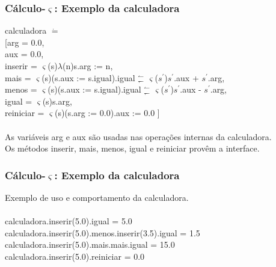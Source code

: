 \documentclass[10pt, compress]{beamer}
\begin{document}
\begin{frame}[fragile]
  \frametitle{Cálculo-$\varsigma$: Exemplo da calculadora}
  calculadora $\dot{=}$
  \\
  \hspace{0.5cm}[\hspace{0.5cm}arg = 0.0,
  \\
  \hspace{1cm} aux = 0.0,
  \\
  \hspace{1cm} inserir = $\varsigma$(s)$\lambda$(n)s.arg := n,
  \\
  \hspace{1cm} mais = $\varsigma$(s)(s.aux := s.igual).igual $^{\leftharpoonup}_{\leftharpoondown}$ $\varsigma$($s^{'}$)$s^{'}$.aux + $s^{'}$.arg,
  \\
  \hspace{1cm} menos = $\varsigma$(s)(s.aux := s.igual).igual $^{\leftharpoonup}_{\leftharpoondown}$ $\varsigma$($s^{'}$)$s^{'}$.aux - $s^{'}$.arg,
  \\
  \hspace{1cm} igual = $\varsigma$(s)s.arg,
  \\
  \hspace{1cm} reiniciar = $\varsigma$(s)(s.arg := 0.0).aux := 0.0 ]
  \\~\\
  As variáveis arg e aux são usadas nas operações internas da calculadora.
  \\
  Os métodos inserir, mais, menos, igual e reiniciar provêm a interface.
\end{frame}

\begin{frame}[fragile]
  \frametitle{Cálculo-$\varsigma$: Exemplo da calculadora}
  Exemplo de uso e comportamento da calculadora.
  \\~\\
  calculadora.inserir(5.0).igual = 5.0
  \\
  calculadora.inserir(5.0).menos.inserir(3.5).igual = 1.5
  \\
  calculadora.inserir(5.0).mais.mais.igual = 15.0
  \\
  calculadora.inserir(5.0).reiniciar = 0.0
\end{frame}
\end{document}
